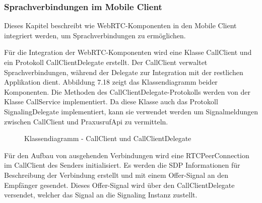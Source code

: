 \subsubsection{Sprachverbindungen im Mobile Client}

Dieses Kapitel beschreibt wie WebRTC-Komponenten in den Mobile Client integriert werden, um Sprachverbindungen zu ermöglichen.

Für die Integration der WebRTC-Komponenten wird eine Klasse CallClient und ein Protokoll CallClientDelegate erstellt.
Der CallClient verwaltet Sprachverbindungen, während der Delegate zur Integration mit der restlichen Applikation dient.
Abbildung 7.18 zeigt das Klassendiagramm beider Komponenten.
Die Methoden des CallClientDelegate-Protokolls werden von der Klasse CallService implementiert.
Da diese Klasse auch das Protokoll SignalingDelegate implementiert, kann sie verwendet werden um Signalmeldungen zwischen CallClient und PraxusrufApi zu vermitteln.

\begin{figure}[h]
    \centering
    \begin{minipage}[b]{0.6\textwidth}
        \caption{Klassendiagramm - CallClient und CallClientDelegate}
    \end{minipage}
\end{figure}

Für den Aufbau von ausgehenden Verbindungen wird eine RTCPeerConnection im CallClient des Senders initialisiert.
Es werden die SDP Informationen für Beschreibung der Verbindung erstellt und mit einem Offer-Signal an den Empfänger gesendet.
Dieses Offer-Signal wird über den CallClientDelegate versendet, welcher das Signal an die Signaling Instanz zustellt.

